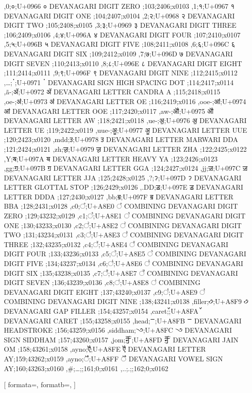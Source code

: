 \documentclass{article}
\begin{document}
{,0;०;U+0966 ० DEVANAGARI DIGIT ZERO ;103;2406;x0103
,1;१;U+0967 १ DEVANAGARI DIGIT ONE ;104;2407;x0104
,2;२;U+0968 २ DEVANAGARI DIGIT TWO ;105;2408;x0105
,3;३;U+0969 ३ DEVANAGARI DIGIT THREE ;106;2409;x0106
,4;४;U+096A ४ DEVANAGARI DIGIT FOUR ;107;2410;x0107
,5;५;U+096B ५ DEVANAGARI DIGIT FIVE ;108;2411;x0108
,6;६;U+096C ६ DEVANAGARI DIGIT SIX ;109;2412;x0109
,7;७;U+096D ७ DEVANAGARI DIGIT SEVEN ;110;2413;x0110
,8;८;U+096E ८ DEVANAGARI DIGIT EIGHT ;111;2414;x0111
,9;९;U+096F ९ DEVANAGARI DIGIT NINE ;112;2415;x0112
%  
,…;ॱ;U+0971 ॱ DEVANAGARI SIGN HIGH SPACING DOT ;114;2417;x0114
,\~a-;ॲ;U+0972 ॲ DEVANAGARI LETTER CANDRA A ;115;2418;x0115
,oe-;ॳ;U+0973 ॳ DEVANAGARI LETTER OE ;116;2419;x0116
,ooe-;ॴ;U+0974 ॴ DEVANAGARI LETTER OOE ;117;2420;x0117
,aw-;ॵ;U+0975 ॵ DEVANAGARI LETTER AW ;118;2421;x0118
,ue-;ॶ;U+0976 ॶ DEVANAGARI LETTER UE ;119;2422;x0119
,uue-;ॷ;U+0977 ॷ DEVANAGARI LETTER UUE ;120;2423;x0120
,mdd;ॸ;U+0978 ॸ DEVANAGARI LETTER MARWARI DDA ;121;2424;x0121
,zh;ॹ;U+0979 ॹ DEVANAGARI LETTER ZHA ;122;2425;x0122
,Y;ॺ;U+097A ॺ DEVANAGARI LETTER HEAVY YA ;123;2426;x0123
,gg;ॻ;U+097B ॻ DEVANAGARI LETTER GGA ;124;2427;x0124
,jj;ॼ;U+097C ॼ DEVANAGARI LETTER JJA ;125;2428;x0125
,?;ॽ;U+097D ॽ DEVANAGARI LETTER GLOTTAL STOP ;126;2429;x0126
,.DD;ॾ;U+097E ॾ DEVANAGARI LETTER DDDA ;127;2430;x0127
,bb;ॿ;U+097F ॿ DEVANAGARI LETTER BBA ;128;2431;x0128
,c0;꣠;U+A8E0 ꣠ COMBINING DEVANAGARI DIGIT ZERO ;129;43232;x0129
,c1;꣡;U+A8E1 ꣡ COMBINING DEVANAGARI DIGIT ONE ;130;43233;x0130
,c2;꣢;U+A8E2 ꣢ COMBINING DEVANAGARI DIGIT TWO ;131;43234;x0131
,c3;꣣;U+A8E3 ꣣ COMBINING DEVANAGARI DIGIT THREE ;132;43235;x0132
,c4;꣤;U+A8E4 ꣤ COMBINING DEVANAGARI DIGIT FOUR ;133;43236;x0133
,c5;꣥;U+A8E5 ꣥ COMBINING DEVANAGARI DIGIT FIVE ;134;43237;x0134
,c6;꣦;U+A8E6 ꣦ COMBINING DEVANAGARI DIGIT SIX ;135;43238;x0135
,c7;꣧;U+A8E7 ꣧ COMBINING DEVANAGARI DIGIT SEVEN ;136;43239;x0136
,c8;꣨;U+A8E8 ꣨ COMBINING DEVANAGARI DIGIT EIGHT ;137;43240;x0137
,c9;꣩;U+A8E9 ꣩ COMBINING DEVANAGARI DIGIT NINE ;138;43241;x0138
%  
%  
%  
%  
%  
%  
%  
%  
%  
%  
%  
%  
%  
%  
%  
,filler;꣹;U+A8F9 ꣹ DEVANAGARI GAP FILLER ;154;43257;x0154
,caret;꣺;U+A8FA ꣺ DEVANAGARI CARET ;155;43258;x0155
,head;ꣻ;U+A8FB ꣻ DEVANAGARI HEADSTROKE ;156;43259;x0156
,siddham;꣼;U+A8FC ꣼ DEVANAGARI SIGN SIDDHAM ;157;43260;x0157
,jom;ꣽ;U+A8FD ꣽ DEVANAGARI JAIN OM ;158;43261;x0158
,ayno;ꣾ;U+A8FE ꣾ DEVANAGARI LETTER AY;159;43262;x0159
,ayno;ꣿ;U+A8FF ꣿ DEVANAGARI VOWEL SIGN AY;160;43263;x0160
,\#;…;;161;0;x0161
,..;.;;162;0;x0162
}

\setlength{\columnseprule}{0.4pt}
\begin{multicols}{4}
[
formata=,
formatb=\fdevb\Large,
]
\end{multicols}
\end{document}
